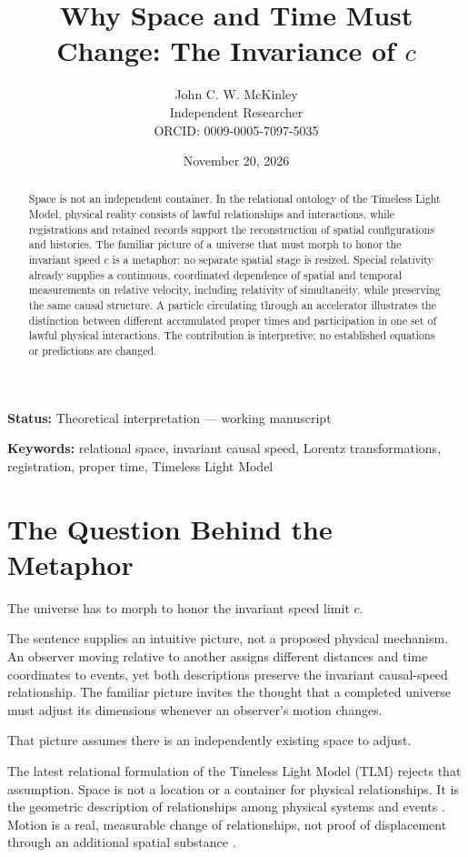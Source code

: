 \documentclass[11pt]{article}
\title{Why Space and Time Must Change: The Invariance of $c$}
\author{John C. W. McKinley\\Independent Researcher\\ORCID: 0009-0005-7097-5035}
\date{November 20, 2026}
\begin{document}
\maketitle
\noindent\textbf{Status:} Theoretical interpretation --- working manuscript

\begin{abstract}
Space is not an independent container. In the relational ontology of the Timeless Light Model, physical reality consists of lawful relationships and interactions, while registrations and retained records support the reconstruction of spatial configurations and histories. The familiar picture of a universe that must morph to honor the invariant speed $c$ is a metaphor: no separate spatial stage is resized. Special relativity already supplies a continuous, coordinated dependence of spatial and temporal measurements on relative velocity, including relativity of simultaneity, while preserving the same causal structure. A particle circulating through an accelerator illustrates the distinction between different accumulated proper times and participation in one set of lawful physical interactions. The contribution is interpretive; no established equations or predictions are changed.
\end{abstract}
\noindent\textbf{Keywords:} relational space, invariant causal speed, Lorentz transformations, registration, proper time, Timeless Light Model

\section{The Question Behind the Metaphor}

The universe has to morph to honor the invariant speed limit $c$.

The sentence supplies an intuitive picture, not a proposed physical mechanism. An observer moving relative to another assigns different distances and time coordinates to events, yet both descriptions preserve the invariant causal-speed relationship. The familiar picture invites the thought that a completed universe must adjust its dimensions whenever an observer's motion changes.

That picture assumes there is an independently existing space to adjust.

The latest relational formulation of the Timeless Light Model (TLM) rejects that assumption. Space is not a location or a container for physical relationships. It is the geometric description of relationships among physical systems and events \cite{mckinleylocation2026,mckinleybox2026}. Motion is a real, measurable change of relationships, not proof of displacement through an additional spatial substance \cite{mckinleymotion2026}.
\end{document}
